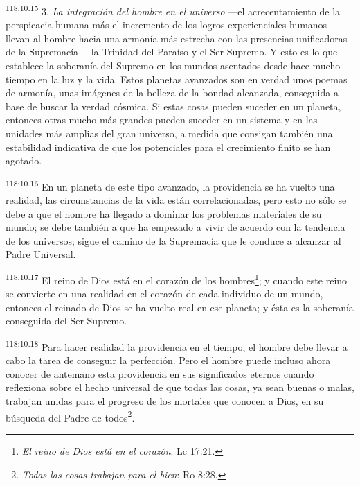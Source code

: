 \documentclass[twoside, 11pt]{book}
\begin{document}
\par
\textsuperscript{118:10.15} 3. \textit{La integración del hombre en el universo} ---el acrecentamiento de la perspicacia humana más el incremento de los logros experienciales humanos llevan al hombre hacia una armonía más estrecha con las presencias unificadoras de la Supremacía ---la Trinidad del Paraíso y el Ser Supremo. Y esto es lo que establece la soberanía del Supremo en los mundos asentados desde hace mucho tiempo en la luz y la vida. Estos planetas avanzados son en verdad unos poemas de armonía, unas imágenes de la belleza de la bondad alcanzada, conseguida a base de buscar la verdad cósmica. Si estas cosas pueden suceder en un planeta, entonces otras mucho más grandes pueden suceder en un sistema y en las unidades más amplias del gran universo, a medida que consigan también una estabilidad indicativa de que los potenciales para el crecimiento finito se han agotado.

\par
\textsuperscript{118:10.16} En un planeta de este tipo avanzado, la providencia se ha vuelto una realidad, las circunstancias de la vida están correlacionadas, pero esto no sólo se debe a que el hombre ha llegado a dominar los problemas materiales de su mundo; se debe también a que ha empezado a vivir de acuerdo con la tendencia de los universos; sigue el camino de la Supremacía que le conduce a alcanzar al Padre Universal.

\par
\textsuperscript{118:10.17} El reino de Dios está en el corazón de los hombres\footnote{\textit{El reino de Dios está en el corazón}: Lc 17:21.}; y cuando este reino se convierte en una realidad en el corazón de cada individuo de un mundo, entonces el reinado de Dios se ha vuelto real en ese planeta; y ésta es la soberanía conseguida del Ser Supremo.

\par
\textsuperscript{118:10.18} Para hacer realidad la providencia en el tiempo, el hombre debe llevar a cabo la tarea de conseguir la perfección. Pero el hombre puede incluso ahora conocer de antemano esta providencia en sus significados eternos cuando reflexiona sobre el hecho universal de que todas las cosas, ya sean buenas o malas, trabajan unidas para el progreso de los mortales que conocen a Dios, en su búsqueda del Padre de todos\footnote{\textit{Todas las cosas trabajan para el bien}: Ro 8:28.}.
\end{document}
